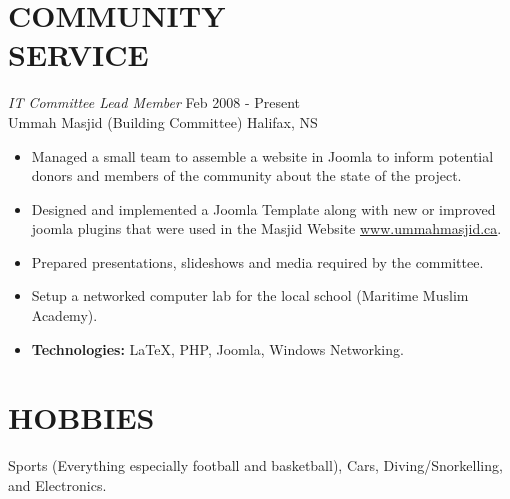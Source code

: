 \documentclass[line,margin]{res}
\begin{document}
\begin{resume}
\section{COMMUNITY \\ SERVICE}
    {\sl IT Committee Lead Member} \hfill Feb 2008 - Present \\
    Ummah Masjid (Building Committee) \hfill Halifax, NS \smallskip
        \begin{itemize}  \itemsep -2pt %
    \item Managed a small team to assemble a website in Joomla to inform
    potential donors and members of the community about the state of the
    project.
    \item Designed and implemented a Joomla Template along with new or
    improved joomla plugins that were used in the Masjid Website
    \href{http://www.ummahmasjid.ca}{www.ummahmasjid.ca}.
    \item Prepared presentations, slideshows and media
    required by the committee.
    \item Setup a networked computer lab for the local school (Maritime
    Muslim Academy).
    \item {\bf Technologies:} \hspace{1pt}
        LaTeX, PHP, Joomla, Windows Networking.
        \end{itemize}

\section{HOBBIES}
    Sports (Everything especially football and basketball), Cars,
    Diving/Snorkelling, \\ and Electronics.

\end{resume}
\end{document}
